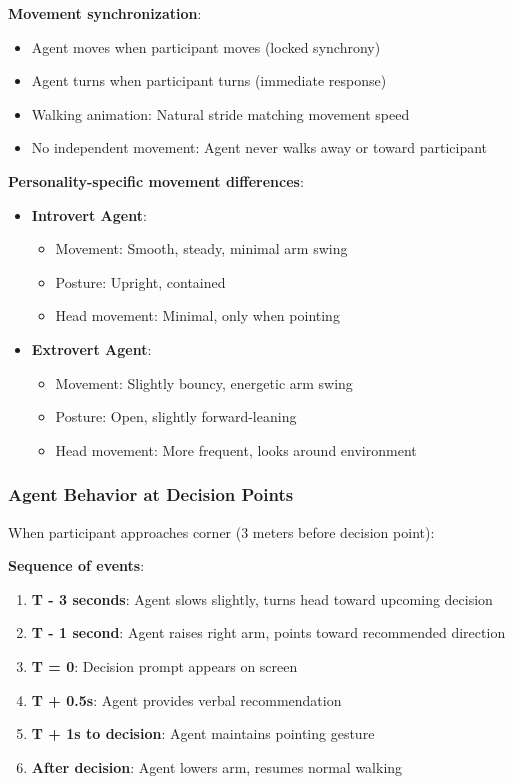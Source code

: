\documentclass[12pt]{article}
\begin{document}
\textbf{Movement synchronization}:
\begin{itemize}
    \item Agent moves when participant moves (locked synchrony)
    \item Agent turns when participant turns (immediate response)
    \item Walking animation: Natural stride matching movement speed
    \item No independent movement: Agent never walks away or toward participant
\end{itemize}

\textbf{Personality-specific movement differences}:
\begin{itemize}
    \item \textbf{Introvert Agent}: 
    \begin{itemize}
        \item Movement: Smooth, steady, minimal arm swing
        \item Posture: Upright, contained
        \item Head movement: Minimal, only when pointing
    \end{itemize}
    
    \item \textbf{Extrovert Agent}:
    \begin{itemize}
        \item Movement: Slightly bouncy, energetic arm swing
        \item Posture: Open, slightly forward-leaning
        \item Head movement: More frequent, looks around environment
    \end{itemize}
\end{itemize}

\subsubsection{Agent Behavior at Decision Points}

When participant approaches corner (3 meters before decision point):

\textbf{Sequence of events}:
\begin{enumerate}
    \item \textbf{T - 3 seconds}: Agent slows slightly, turns head toward upcoming decision
    \item \textbf{T - 1 second}: Agent raises right arm, points toward recommended direction
    \item \textbf{T = 0}: Decision prompt appears on screen
    \item \textbf{T + 0.5s}: Agent provides verbal recommendation
    \item \textbf{T + 1s to decision}: Agent maintains pointing gesture
    \item \textbf{After decision}: Agent lowers arm, resumes normal walking
\end{enumerate}
\end{document}
